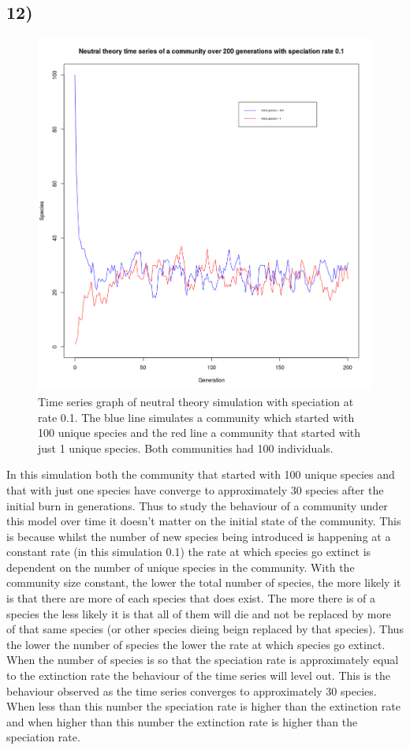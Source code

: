 \documentclass[11pt]{article}
\begin{document}
\subsection*{12)}
\begin{figure}[H]
\begin{center}
\includegraphics[scale=0.35]{../Results/Plots/Neutral_with_speciation.png} 
\caption{Time series graph of neutral theory simulation with speciation at rate 0.1. The blue line simulates a community which started with 100 unique species and the red line a community that started with just 1 unique species. Both communities had 100 individuals.}
\end{center}
\end{figure}
In this simulation both the community that started with 100 unique species and that with just one species have converge to approximately 30 species after the initial burn in generations. Thus to study the behaviour of a community under this model over time it doesn't matter on the initial state of the community. This is because whilst the number of new species being introduced is happening at a constant rate (in this simulation 0.1) the rate at which species go extinct is dependent on the number of unique species in the community. With the community size constant, the lower the total number of species, the more likely it is that there are more of each species that does exist. The more there is of a species the less likely it is that all of them will die and not be replaced by more of that same species (or other species dieing beign replaced by that species). Thus the lower the number of species the lower the rate at which species go extinct. When the number of species is so that the speciation rate is approximately equal to the extinction rate the behaviour of the time series will level out. This is the behaviour observed as the time series converges to approximately 30 species. When less than this number the speciation rate is higher than the extinction rate and when higher than this number the extinction rate is higher than the speciation rate. 
\end{document}
